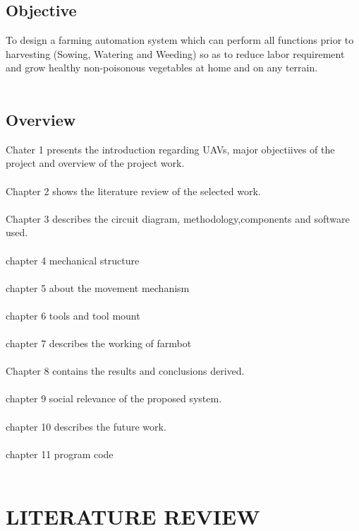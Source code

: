 \documentclass[12pt,a4paper]{report}
\begin{document}
 
 


\section{ Objective}


\hspace*{1cm}
To design a farming automation system which can perform all functions prior to harvesting (Sowing, Watering and Weeding) so as to reduce labor requirement and grow healthy non-poisonous vegetables at home and on any terrain. \\\

\section{ Overview}

Chater 1 presents the introduction regarding UAVs, major objectiives of the project and overview of the project work.
\\\\
Chapter 2  shows the literature review of the selected work.
\\\\
Chapter 3  describes the circuit diagram, methodology,components and software used.
\\\\
chapter 4 mechanical structure
\\\\
chapter 5 about the movement mechanism
\\\\
chapter 6 tools and tool mount
\\\\
chapter 7 describes the working of farmbot
\\\\
Chapter 8  contains the  results and conclusions derived.
\\\\
chapter 9 social relevance of the proposed system.
\\\\
chapter 10 describes the future work.
\\\\
chapter 11 program code
\\\\



\chapter{ LITERATURE REVIEW}
\end{document}
